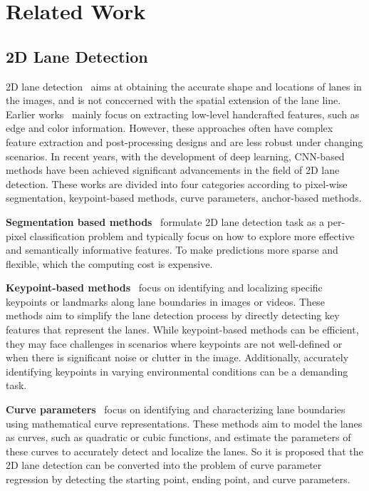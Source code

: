 \section{Related Work}
\label{sec:relatedwork}

\subsection{2D Lane Detection}
\label{subsec:2d}

2D lane detection~\cite{chen2023improving, jin2022eigenlanes, liu2021end, pan2018spatial, tabelini2021polylanenet, yang2023lane} aims at obtaining the accurate shape and locations of lanes in the images, and is not conccerned with the spatial extension of the lane line.
Earlier works~\cite{aly2008real, he2004color, kim2008robust, wang2004lane, zhou2010novel, srivastava2014improved, chanawangsa2012new} mainly focus on extracting low-level handcrafted features, such as edge and color information.
However, these approaches often have complex feature extraction and post-processing designs and are less robust under changing scenarios.
In recent years, with the development of deep learning, CNN-based methods have been achieved significant advancements in the field of 2D lane detection.
These works are divided into four categories according to pixel-wise segmentation, keypoint-based  methods, curve parameters, anchor-based methods.

\textbf{Segmentation based methods}~\cite{hou2019learning, neven2018towards, pan2018spatial, qin2020ultra, dong2023hybrid, lee2023end} formulate 2D lane detection task as a per-pixel classification problem and typically focus on how to explore more effective and semantically informative features.
To make predictions more sparse and flexible, which the computing cost is expensive.

\textbf{Keypoint-based methods}~\cite{ko2021key, qu2021focus, wang2022keypoint, xu2022rclane} focus on identifying and localizing specific keypoints or landmarks along lane boundaries in images or videos.
These methods aim to simplify the lane detection process by directly detecting key features that represent the lanes.
While keypoint-based methods can be efficient, they may face challenges in scenarios where keypoints are not well-defined or when there is significant noise or clutter in the image.
Additionally, accurately identifying keypoints in varying environmental conditions can be a demanding task.

\textbf{Curve parameters}~\cite{feng2022rethinking, tabelini2021polylanenet, chen2023improving} focus on identifying and characterizing lane boundaries using mathematical curve representations.
These methods aim to model the lanes as curves, such as quadratic or cubic functions, and estimate the parameters of these curves to accurately detect and localize the lanes.
So it is proposed that the 2D lane detection can be converted into the problem of curve parameter regression by detecting the starting point, ending point, and curve parameters.

